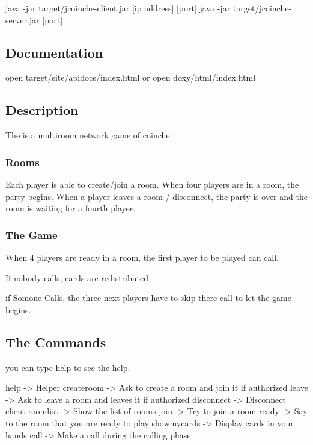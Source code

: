 \begin{DoxyCode}
java -jar target/jcoinche-client.jar [ip address] [port]
java -jar target/jcoinche-server.jar [port]
\end{DoxyCode}


\subsection*{Documentation}

open {\ttfamily target/site/apidocs/index.\+html} or open {\ttfamily doxy/html/index.\+html}

\subsection*{Description}

The is a multiroom network game of coinche.

\subsubsection*{Rooms}

Each player is able to create/join a room. When four players are in a room, the party begins. When a player leaves a room / disconnect, the party is over and the room is waiting for a fourth player.

\subsubsection*{The Game}

When 4 players are ready in a room, the first player to be played can call.
\begin{DoxyItemize}
\item If nobody calls, cards are redistributed
\item if Somone Calls, the three next players have to skip there call to let the game begins.
\end{DoxyItemize}

\subsection*{The Commands}

you can type {\ttfamily help} to see the help.


\begin{DoxyCode}
help            ->      Helper
createroom      ->      Ask to create a room and join it if authorized
leave           ->      Ask to leave a room and leaves it if authorized 
disconnect      ->      Disconnect client
roomlist        ->      Show the list of rooms
join            ->      Try to join a room
ready           ->      Say to the room that you are ready to play
showmycards     ->      Display cards in your hands
call            ->      Make a call during the calling phase
\end{DoxyCode}


